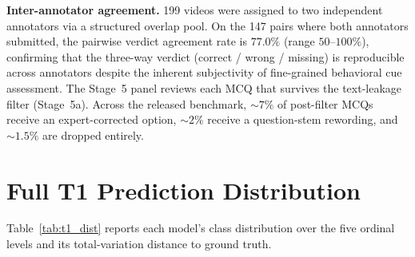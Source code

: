 \documentclass{llmxive}
\begin{document}
\noindent\textbf{Inter-annotator agreement.} 199 videos were assigned to two independent annotators via a structured overlap pool. On the 147 pairs where both annotators submitted, the pairwise verdict agreement rate is $77.0\%$ (range $50$--$100\%$), confirming that the three-way verdict (correct / wrong / missing) is reproducible across annotators despite the inherent subjectivity of fine-grained behavioral cue assessment.
The Stage~5 panel reviews each MCQ that survives the text-leakage filter (Stage~5a). Across the released benchmark, $\sim\!7\%$ of post-filter MCQs receive an expert-corrected option, $\sim\!2\%$ receive a question-stem rewording, and $\sim\!1.5\%$ are dropped entirely.

\section{Full T1 Prediction Distribution}
\label{app:t1_dist}

Table~\ref{tab:t1_dist} reports each model's class distribution over the five ordinal levels and its total-variation distance to ground truth.
\end{document}
